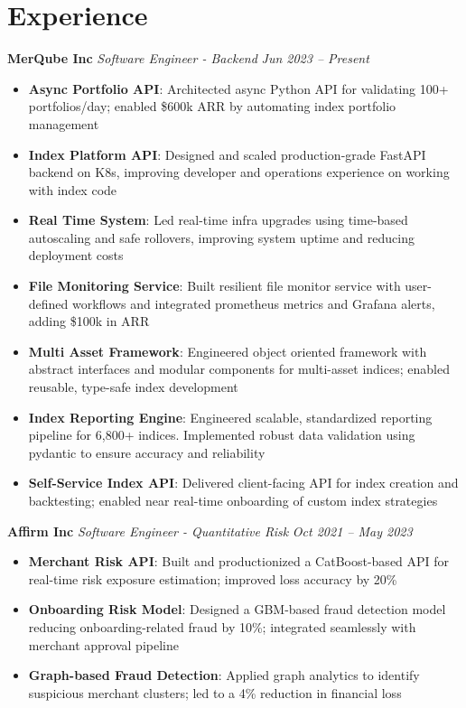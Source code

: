 \documentclass[letterpaper,10pt]{article}
\begin{document}
\section*{Experience}
\textbf{{MerQube Inc}} \textit{{Software Engineer - Backend}} \hfill \textit{{Jun 2023 -- Present}}
\begin{itemize}
    \item \textbf{{Async Portfolio API}}: Architected async Python API for validating 100+ portfolios/day; enabled \$600k ARR by automating index portfolio management
    \item \textbf{{Index Platform API}}: Designed and scaled production-grade FastAPI backend on K8s, improving developer and operations experience on working with index code
    \item \textbf{{Real Time System}}: Led real-time infra upgrades using time-based autoscaling and safe rollovers, improving system uptime and reducing deployment costs
    \item \textbf{{File Monitoring Service}}: Built resilient file monitor service with user-defined workflows and integrated prometheus metrics and Grafana alerts, adding \$100k in ARR
    \item \textbf{{Multi Asset Framework}}: Engineered object oriented framework with abstract interfaces and modular components for multi-asset indices; enabled reusable, type-safe index development
    \item \textbf{{Index Reporting Engine}}: Engineered scalable, standardized reporting pipeline for 6,800+ indices. Implemented robust data validation using pydantic to ensure accuracy and reliability
    \item \textbf{{Self-Service Index API}}: Delivered client-facing API for index creation and backtesting; enabled near real-time onboarding of custom index strategies
\end{itemize}
\textbf{{Affirm Inc}} \textit{{Software Engineer - Quantitative Risk}} \hfill \textit{{Oct 2021 -- May 2023}}
\begin{itemize}
    \item \textbf{{Merchant Risk API}}: Built and productionized a CatBoost-based API for real-time risk exposure estimation; improved loss accuracy by 20\%
    \item \textbf{{Onboarding Risk Model}}: Designed a GBM-based fraud detection model reducing onboarding-related fraud by 10\%; integrated seamlessly with merchant approval pipeline
    \item \textbf{{Graph-based Fraud Detection}}: Applied graph analytics to identify suspicious merchant clusters; led to a 4\% reduction in financial loss
\end{itemize}
\end{document}

